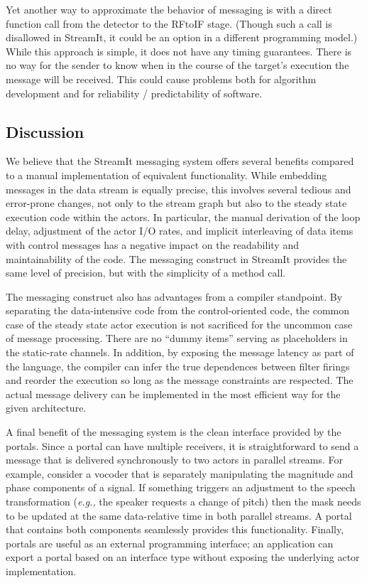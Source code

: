 Yet another way to approximate the behavior of messaging is with a
direct function call from the detector to the RFtoIF stage.  (Though
such a call is disallowed in StreamIt, it could be an option in a
different programming model.)  While this approach is simple, it does
not have any timing guarantees.  There is no way for the sender to
know when in the course of the target's execution the message will be
received.  This could cause problems both for algorithm development
and for reliability / predictability of software.

\vspace{12pt}
\subsection{Discussion}

We believe that the StreamIt messaging system offers several benefits
compared to a manual implementation of equivalent functionality.
While embedding messages in the data stream is equally precise, this
involves several tedious and error-prone changes, not only to the
stream graph but also to the steady state execution code within the
actors.  In particular, the manual derivation of the loop delay,
adjustment of the actor I/O rates, and implicit interleaving of data
items with control messages has a negative impact on the readability
and maintainability of the code.  The messaging construct in StreamIt
provides the same level of precision, but with the simplicity of a
method call.

The messaging construct also has advantages from a compiler
standpoint.  By separating the data-intensive code from the
control-oriented code, the common case of the steady state actor
execution is not sacrificed for the uncommon case of message
processing.  There are no ``dummy items'' serving as placeholders in
the static-rate channels.  In addition, by exposing the message
latency as part of the language, the compiler can infer the true
dependences between filter firings and reorder the execution so long
as the message constraints are respected.  The actual message delivery
can be implemented in the most efficient way for the given
architecture.

A final benefit of the messaging system is the clean interface
provided by the portals.  Since a portal can have multiple receivers,
it is straightforward to send a message that is delivered
synchronously to two actors in parallel streams.  For example,
consider a vocoder that is separately manipulating the magnitude and
phase components of a signal.  If something triggers an adjustment to
the speech transformation ({\it e.g.,} the speaker requests a change
of pitch) then the mask needs to be updated at the same data-relative
time in both parallel streams.  A portal that contains both components
seamlessly provides this functionality.  Finally, portals are useful
as an external programming interface; an application can export a
portal based on an interface type without exposing the underlying
actor implementation.

